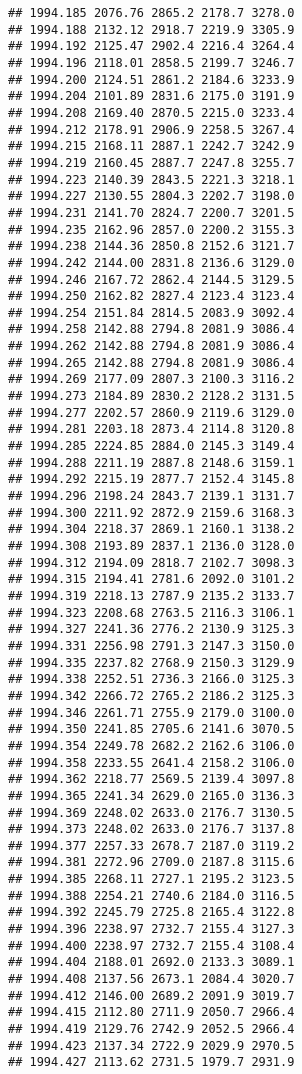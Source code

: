 \documentclass[
]{article}
\begin{document}
\begin{verbatim}
## 1994.185 2076.76 2865.2 2178.7 3278.0
## 1994.188 2132.12 2918.7 2219.9 3305.9
## 1994.192 2125.47 2902.4 2216.4 3264.4
## 1994.196 2118.01 2858.5 2199.7 3246.7
## 1994.200 2124.51 2861.2 2184.6 3233.9
## 1994.204 2101.89 2831.6 2175.0 3191.9
## 1994.208 2169.40 2870.5 2215.0 3233.4
## 1994.212 2178.91 2906.9 2258.5 3267.4
## 1994.215 2168.11 2887.1 2242.7 3242.9
## 1994.219 2160.45 2887.7 2247.8 3255.7
## 1994.223 2140.39 2843.5 2221.3 3218.1
## 1994.227 2130.55 2804.3 2202.7 3198.0
## 1994.231 2141.70 2824.7 2200.7 3201.5
## 1994.235 2162.96 2857.0 2200.2 3155.3
## 1994.238 2144.36 2850.8 2152.6 3121.7
## 1994.242 2144.00 2831.8 2136.6 3129.0
## 1994.246 2167.72 2862.4 2144.5 3129.5
## 1994.250 2162.82 2827.4 2123.4 3123.4
## 1994.254 2151.84 2814.5 2083.9 3092.4
## 1994.258 2142.88 2794.8 2081.9 3086.4
## 1994.262 2142.88 2794.8 2081.9 3086.4
## 1994.265 2142.88 2794.8 2081.9 3086.4
## 1994.269 2177.09 2807.3 2100.3 3116.2
## 1994.273 2184.89 2830.2 2128.2 3131.5
## 1994.277 2202.57 2860.9 2119.6 3129.0
## 1994.281 2203.18 2873.4 2114.8 3120.8
## 1994.285 2224.85 2884.0 2145.3 3149.4
## 1994.288 2211.19 2887.8 2148.6 3159.1
## 1994.292 2215.19 2877.7 2152.4 3145.8
## 1994.296 2198.24 2843.7 2139.1 3131.7
## 1994.300 2211.92 2872.9 2159.6 3168.3
## 1994.304 2218.37 2869.1 2160.1 3138.2
## 1994.308 2193.89 2837.1 2136.0 3128.0
## 1994.312 2194.09 2818.7 2102.7 3098.3
## 1994.315 2194.41 2781.6 2092.0 3101.2
## 1994.319 2218.13 2787.9 2135.2 3133.7
## 1994.323 2208.68 2763.5 2116.3 3106.1
## 1994.327 2241.36 2776.2 2130.9 3125.3
## 1994.331 2256.98 2791.3 2147.3 3150.0
## 1994.335 2237.82 2768.9 2150.3 3129.9
## 1994.338 2252.51 2736.3 2166.0 3125.3
## 1994.342 2266.72 2765.2 2186.2 3125.3
## 1994.346 2261.71 2755.9 2179.0 3100.0
## 1994.350 2241.85 2705.6 2141.6 3070.5
## 1994.354 2249.78 2682.2 2162.6 3106.0
## 1994.358 2233.55 2641.4 2158.2 3106.0
## 1994.362 2218.77 2569.5 2139.4 3097.8
## 1994.365 2241.34 2629.0 2165.0 3136.3
## 1994.369 2248.02 2633.0 2176.7 3130.5
## 1994.373 2248.02 2633.0 2176.7 3137.8
## 1994.377 2257.33 2678.7 2187.0 3119.2
## 1994.381 2272.96 2709.0 2187.8 3115.6
## 1994.385 2268.11 2727.1 2195.2 3123.5
## 1994.388 2254.21 2740.6 2184.0 3116.5
## 1994.392 2245.79 2725.8 2165.4 3122.8
## 1994.396 2238.97 2732.7 2155.4 3127.3
## 1994.400 2238.97 2732.7 2155.4 3108.4
## 1994.404 2188.01 2692.0 2133.3 3089.1
## 1994.408 2137.56 2673.1 2084.4 3020.7
## 1994.412 2146.00 2689.2 2091.9 3019.7
## 1994.415 2112.80 2711.9 2050.7 2966.4
## 1994.419 2129.76 2742.9 2052.5 2966.4
## 1994.423 2137.34 2722.9 2029.9 2970.5
## 1994.427 2113.62 2731.5 1979.7 2931.9

\end{verbatim}
\end{document}
